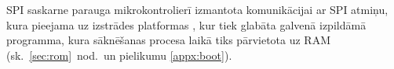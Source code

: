 		
		SPI saskarne parauga mikrokontrolierī izmantota
		komunikācijai ar SPI  atmiņu,
		kura pieejama uz izstrādes platformas \cite[43.~lpp.]{FusionGuide},
		kur tiek glabāta galvenā izpildāmā programma, kura sāknēšanas procesa
		laikā tiks pārvietota uz RAM (sk.~\ref{sec:rom}~nod.~un pielikumu \ref{appx:boot}).
